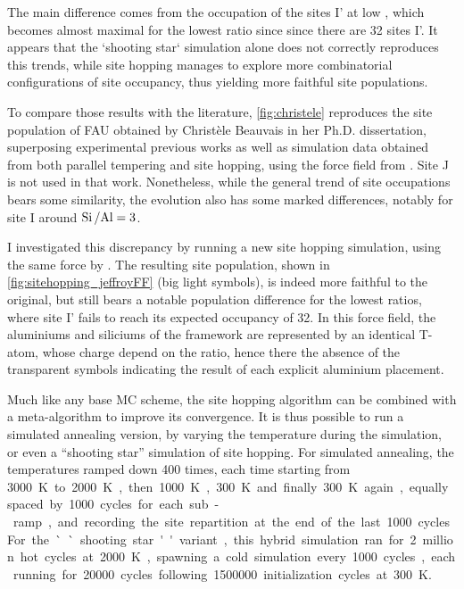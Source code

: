 \documentclass[main.tex]{subfiles}
\begin{document}
The main difference comes from the occupation of the sites I' at low \SiAl, which becomes almost maximal for the lowest ratio since since there are 32 sites I'. It appears that the `shooting star` simulation alone does not correctly reproduces this trends, while site hopping manages to explore more combinatorial configurations of site occupancy, thus yielding more faithful site populations.

To compare those results with the literature, \cref{fig:christele} reproduces the site population of FAU obtained by Christèle Beauvais in her Ph.D. dissertation, superposing experimental previous works as well as simulation data obtained from both parallel tempering and site hopping, using the force field from \textcite{DiLellaFF}. Site J is not used in that work. Nonetheless, while the general trend of site occupations bears some similarity, the evolution also has some marked differences, notably for site I around $\mbox{Si\,/Al} = 3$.

I investigated this discrepancy by running a new site hopping simulation, using the same force by \textcite{DiLellaFF}. The resulting site population, shown in \cref{fig:sitehopping_jeffroyFF} (big light symbols), is indeed more faithful to the original, but still bears a notable population difference for the lowest \SiAl ratios, where site I' fails to reach its expected occupancy of 32. In this force field, the aluminiums and siliciums of the framework are represented by an identical T-atom, whose charge depend on the \SiAl ratio, hence there the absence of the transparent symbols indicating the result of each explicit aluminium placement.

Much like any base MC scheme, the site hopping algorithm can be combined with a meta-algorithm to improve its convergence. It is thus possible to run a simulated annealing version, by varying the temperature during the simulation, or even a ``shooting star'' simulation of site hopping. For simulated annealing, the temperatures ramped down \num{400} times, each time starting from \qty{3000}K to \qty{2000}K, then \qty{1000}K, \qty{300}K and finally \qty{300}K again, equally spaced by \num{1000} cycles for each sub-ramp, and recording the site repartition at the end of the last \num{1000} cycles. For the ``shooting star'' variant, this hybrid simulation ran for 2 million hot cycles at \qty{2000}K, spawning a cold simulation every \num{1000} cycles, each running for \num{20000} cycles following \num{1500000} initialization cycles at \qty{300}K.
\end{document}
